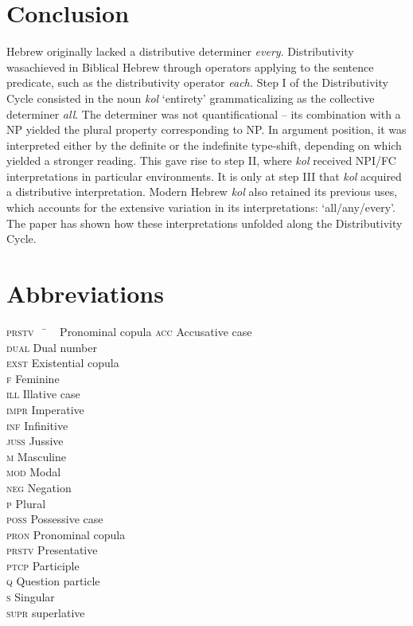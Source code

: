 \documentclass[output=paper]{langsci/langscibook}
\begin{document}
\section{Conclusion}\label{sec:doron:7}%
Hebrew originally lacked a distributive determiner \textit{every}. Distributivity was\linebreak achieved in Biblical Hebrew through operators applying to the sentence predicate, such as the distributivity operator \textit{each.} Step I of the Distributivity Cycle consisted in the noun \textit{kol} ‘entirety’ grammaticalizing as the collective determiner \textit{all}. The determiner was not quantificational – its combination with a NP yielded the plural property corresponding to NP. In argument position, it was interpreted either by the definite or the indefinite type-shift, depending on which yielded a stronger reading. This gave rise to step II, where \textit{kol} received NPI/FC interpretations in particular environments. It is only at step III that \textit{kol} acquired a distributive interpretation. Modern Hebrew \textit{kol} also retained its previous uses, which accounts for the extensive variation in its interpretations: ‘all\slash any\slash every’. The paper has shown how these interpretations unfolded along the Distributivity Cycle.

\section*{Abbreviations}
\begin{multicols}{2}
\begin{tabbing}
\textsc{prstv} ~ \= ~ Pronominal copula\kill
\textsc{acc} \> Accusative case\\
\textsc{dual} \> Dual number\\
\textsc{exst} \> Existential copula\\
\textsc{f} \> Feminine\\
\textsc{ill} \> Illative case\\
\textsc{impr} \> Imperative\\
\textsc{inf} \> Infinitive\\
\textsc{juss} \> Jussive\\
\textsc{m} \> Masculine\\
\textsc{mod} \> Modal\\
\textsc{neg} \> Negation\\
\textsc{p} \> Plural\\
\textsc{poss} \> Possessive case\\
\textsc{pron} \> Pronominal copula\\
\textsc{prstv} \> Presentative\\
\textsc{ptcp} \> Participle\\
\textsc{q} \>    Question particle\\
\textsc{s} \> Singular\\
\textsc{supr} \> superlative
\end{tabbing}
\end{multicols}
\end{document}
